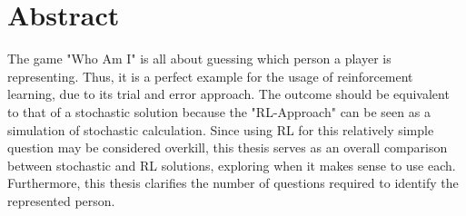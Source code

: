 \chapter{Abstract}

The game "Who Am I" is all about guessing which person a player is representing. Thus, it is a perfect example for the usage of reinforcement learning, due to its trial and error approach. The outcome should be equivalent to that of a stochastic solution because the "RL-Approach" can be seen as a simulation of stochastic calculation. Since using RL for this relatively simple question may be considered overkill, this thesis serves as an overall comparison between stochastic and RL solutions, exploring when it makes sense to use each. Furthermore, this thesis clarifies the number of questions required to identify the represented person.